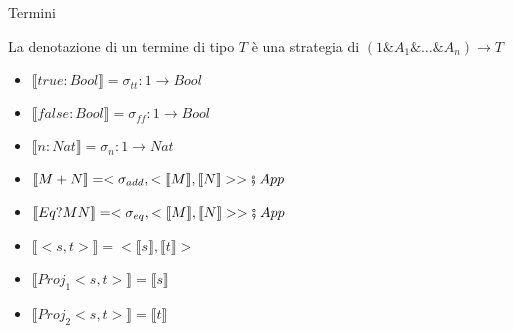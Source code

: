 \documentclass{beamer}
\begin{document}
\begin{frame}
	
	\begin{block}{Termini}
		
		\small
		
		La denotazione di un termine di tipo $T$ è una strategia di $(1\& A_1 \& \dots \& A_n)\rightarrow T$
		
		\begin{itemize}
			\item $\llbracket true : Bool \rrbracket = \sigma_{tt} : 1 \rightarrow Bool$
			\item $\llbracket false : Bool \rrbracket = \sigma_{ff} : 1 \rightarrow Bool$
			\item $\llbracket n : Nat \rrbracket = \sigma_n : 1 \rightarrow Nat$
			\item $\llbracket M + N \rrbracket = < \sigma_{add} , < \llbracket M \rrbracket , \llbracket N \rrbracket > > \fatsemi \; App$
			\item $\llbracket Eq? M N \rrbracket = < \sigma_{eq} , < \llbracket M \rrbracket , \llbracket N \rrbracket > > \fatsemi \; App$
			\item $\llbracket < s ,t > \rrbracket = <\llbracket s \rrbracket , \llbracket t \rrbracket>$
			\item $\llbracket Proj_1<s,t> \rrbracket = \llbracket s \rrbracket$
			\item $\llbracket Proj_2<s,t> \rrbracket = \llbracket t \rrbracket$
		\end{itemize}

	\end{block}

	
\end{frame}
\end{document}
